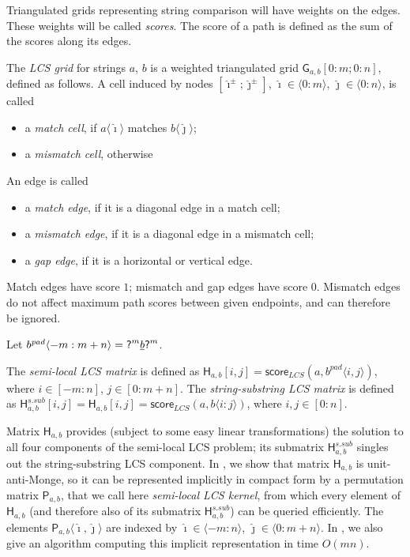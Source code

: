 \documentclass[a4paper,UKenglish,cleveref]{lipics-v2021}
\newcommand{\R}{\mathsf}
\newcommand{\A}{\hat}
\newcommand{\ssub}{\mathit{s.sub}}
\newcommand{\charwild}{\textsf ?}
\newcommand{\bra}[1]{[#1]}
\newcommand{\ang}[1]{\langle#1\rangle}
\newcommand{\rH}{\mathsf H}
\newcommand{\rP}{\mathsf P}
\newcommand{\SSub}[1]{#1^\ssub}
\begin{document}
Triangulated grids representing string comparison will have weights on the edges.
These weights will be called \emph{scores}.
The score of a path is defined as the sum of the scores along its edges.
%
\begin{definition}
\label{def-grid-lcs}
%
%
\index{$\R G_{a,b}$: LCS grid}%
The \emph{LCS grid} for strings $a$, $b$
is a weighted triangulated grid $\R G_{a,b}\bra{0:m;0:n}$, defined as follows.
A cell induced by nodes $\bra{\A\imath^\pm;\A\jmath^\pm}$, 
$\A\imath\in\ang{0:m}$, $\A\jmath\in\ang{0:n}$, is called
%
\begin{itemize}
%
\item a \emph{match cell}, if $a\ang{\A\imath}$ matches $b\ang{\A\jmath}$;
\item a \emph{mismatch cell}, otherwise
%
\end{itemize}
%
An edge is called
%
\begin{itemize}
%
\item a \emph{match edge}, if it is a diagonal edge in a match cell;
\item a \emph{mismatch edge}, if it is a diagonal edge in a mismatch cell;
\item a \emph{gap edge}, if it is a horizontal or vertical edge.
%
\end{itemize}
%
Match edges have score $1$; mismatch and gap edges have score $0$.
Mismatch edges do not affect maximum path scores between given endpoints, 
and can therefore be ignored.
%
\end{definition}

Let $b^{\mathit{pad}}\ang{-m:m+n} = \charwild^m \underline{b} \charwild^m$.
%
\begin{definition}
\label{def-lcsmat}
%
The \emph{semi-local LCS matrix} is defined as 
$\rH_{a,b}[i,j] = \mathsf{score}_{LCS}(a, b^{\mathit{pad}}\ang{i,j})$,
where $i \in \bra{-m:n}$, $j \in \bra{0:m+n}$.
The \emph{string-substring LCS matrix} is defined as 
$\SSub\rH_{a,b}[i,j] = \rH_{a,b}[i,j] = \mathsf{score}_{LCS}(a, b\ang{i:j})$, 
where $i,j \in \bra{0:n}$.
%
\end{definition}
%
Matrix $\rH_{a,b}$ provides (subject to some easy linear transformations)
the solution to all four components of the semi-local LCS problem;
its submatrix $\SSub\rH_{a,b}$ singles out the string-substring LCS component.
In \cite{Tiskin:08_MCS}, we show that matrix $\rH_{a,b}$ is unit-anti-Monge,
so it can be represented implicitly in compact form 
by a permutation matrix $\rP_{a,b}$, that we call here \emph{semi-local LCS kernel},
from which every element of $\rH_{a,b}$ (and therefore also of its submatrix $\SSub\rH_{a,b}$) 
can be queried efficiently.
The elements $\rP_{a,b}\ang{\A\imath,\A\jmath}$ are indexed 
by $\A\imath \in \ang{-m:n}$, $\A\jmath \in \ang{0:m+n}$.
In \cite{Tiskin:08_MCS}, we also give an algorithm 
computing this implicit representation in time $O(mn)$.
\end{document}
